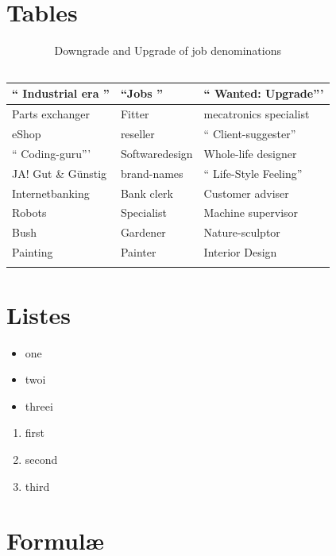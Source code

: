 \section{Tables}

\begin{table}[H]
\small
\centering
\begin{tabular}{p{5cm}|l|p{3cm}}
`` Industrial era '' &  ``Jobs '' & `` Wanted: Upgrade''' \\ \hline
Parts exchanger & Fitter & mecatronics specialist \\
eShop & reseller & `` Client-suggester'' \\
`` Coding-guru''' & Softwaredesign & Whole-life designer \\
JA! Gut \& Günstig & brand-names & `` Life-Style Feeling'' \\
Internetbanking & Bank clerk & Customer adviser \\
Robots & Specialist & Machine supervisor \\
Bush & Gardener & Nature-sculptor \\
Painting & Painter & Interior Design \\
 &  & \\
\end{tabular}
\caption[Downgrade and upgrade of job denominations]{Downgrade and Upgrade of job denominations \\ \ \ \ \cite{DueckKo:2016}}
\label{tab:Downgrade and Upgrade of job denominations}
\end{table} 

\section{Listes}

\begin{itemize}
 \itemsep0pt
 \item one
 \item twoi
 \item threei
\end{itemize}

\begin{enumerate}
 \itemsep0pt
 \item first
 \item second
 \item third
\end{enumerate}


\section{Formulæ}

